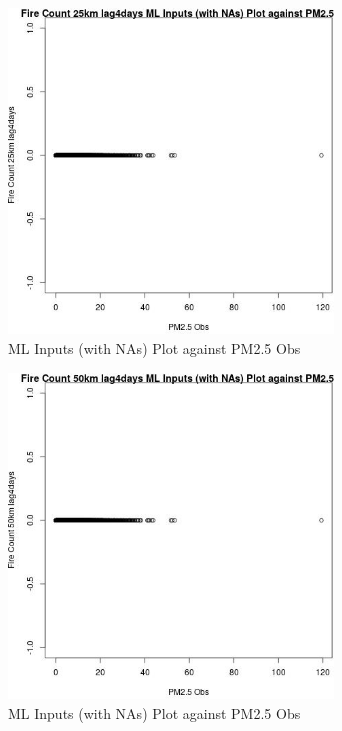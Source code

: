 \begin{figure} 
\centering  
\includegraphics[width=0.77\textwidth]{Code_Outputs/Report_ML_input_PM25_Step4_part_e_de_duplicated_aves_compiled_2019-05-18wNAs_Fire_Count_25km_lag4daysvPM25_Obs.jpg} 
\caption{\label{fig:Report_ML_input_PM25_Step4_part_e_de_duplicated_aves_compiled_2019-05-18wNAsFire_Count_25km_lag4daysvPM25_Obs}ML Inputs (with NAs) Plot against PM2.5 Obs} 
\end{figure} 
 

\begin{figure} 
\centering  
\includegraphics[width=0.77\textwidth]{Code_Outputs/Report_ML_input_PM25_Step4_part_e_de_duplicated_aves_compiled_2019-05-18wNAs_Fire_Count_50km_lag4daysvPM25_Obs.jpg} 
\caption{\label{fig:Report_ML_input_PM25_Step4_part_e_de_duplicated_aves_compiled_2019-05-18wNAsFire_Count_50km_lag4daysvPM25_Obs}ML Inputs (with NAs) Plot against PM2.5 Obs} 
\end{figure} 
 

